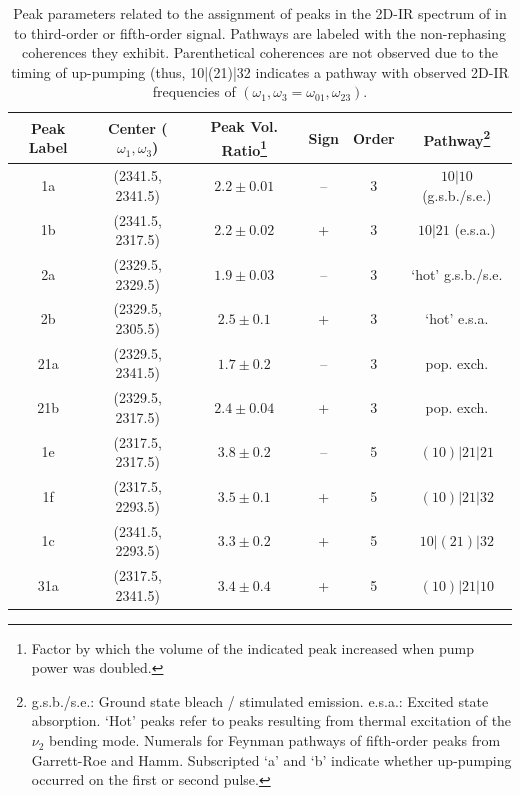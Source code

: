 {\setlength{\tabcolsep}{0.4em}
\begin{table}
  \centering
  \caption[Assignment of CO2 features to 3rd or 5th order]{\label{tab:fifth_order}Peak parameters related to the assignment of peaks in the 2D-IR spectrum of  in \ce{[Im_{4,1}][TFA]} to third-order or fifth-order signal. Pathways are labeled with the non-rephasing coherences they exhibit. Parenthetical coherences are not observed due to the timing of up-pumping (thus, 10|(21)|32 indicates a pathway with observed 2D-IR frequencies of $(\omega_1,\omega_3 = \omega_{01},\omega_{23})$.}
  \begin{tabular}{c c c c c c}%
    \toprule %
    Peak Label & Center (\(\omega_{1}, \omega_{3}\)) & Peak Vol. Ratio\footnote{Factor by which the volume of the indicated peak increased when pump power was doubled.}  & Sign & Order & Pathway\footnote{g.s.b./s.e.: Ground state bleach / stimulated emission. e.s.a.: Excited state absorption. `Hot' peaks refer to peaks resulting from thermal excitation of the \(\nu_2\) bending mode. Numerals for Feynman pathways of fifth-order peaks from Garrett-Roe and Hamm.\cite{Garrett-Roe2009b} Subscripted `a' and `b' indicate whether up-pumping occurred on the first or second pulse.} \\
    \midrule
    1a & (2341.5, 2341.5) &$2.2 \pm 0.01$ & -- & 3 & $10|10$ (g.s.b./s.e.)  \\
    1b & (2341.5, 2317.5)&$2.2 \pm 0.02$ & + & 3 & $10|21$ (e.s.a.)   \\
    2a & (2329.5, 2329.5) &$1.9 \pm 0.03$ & -- & 3  & `hot' g.s.b./s.e. \\
    2b & (2329.5, 2305.5) &$2.5 \pm 0.1$ & + & 3  & `hot' e.s.a.  \\
    21a & (2329.5, 2341.5) & $1.7 \pm 0.2$ & --& 3  & pop. exch. \\
    21b & (2329.5, 2317.5) & $2.4 \pm 0.04$ & + & 3 & pop. exch. \\
    1e & (2317.5, 2317.5) & $3.8 \pm 0.2$ & -- & 5 & $\left(10\right)|21|21$ \\
    1f & (2317.5, 2293.5) & $3.5 \pm 0.1$ & + & 5  & $\left(10\right)|21|32$ \\
    1c & (2341.5, 2293.5) & $3.3 \pm 0.2$ & + &5 & $10|\left(21\right)|32$  \\
    31a & (2317.5, 2341.5) &$3.4 \pm 0.4$ & + & 5 & $\left(10\right)|21|10$ \\
    \bottomrule
  \end{tabular}
\end{table}

}
